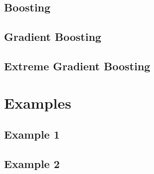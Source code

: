 
\subsection{Boosting}

\subsection{Gradient Boosting}

\subsection{Extreme Gradient Boosting}


\section{Examples}
\subsection{Example 1}
\subsection{Example 2}

